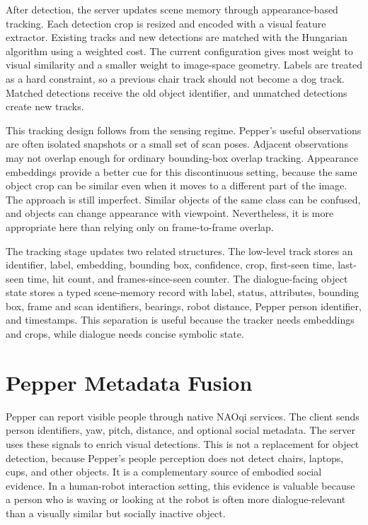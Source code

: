 After detection, the server updates scene memory through appearance-based tracking. Each detection crop is resized and encoded with a visual feature extractor. Existing tracks and new detections are matched with the Hungarian algorithm using a weighted cost. The current configuration gives most weight to visual similarity and a smaller weight to image-space geometry. Labels are treated as a hard constraint, so a previous chair track should not become a dog track. Matched detections receive the old object identifier, and unmatched detections create new tracks.

This tracking design follows from the sensing regime. Pepper's useful observations are often isolated snapshots or a small set of scan poses. Adjacent observations may not overlap enough for ordinary bounding-box overlap tracking. Appearance embeddings provide a better cue for this discontinuous setting, because the same object crop can be similar even when it moves to a different part of the image. The approach is still imperfect. Similar objects of the same class can be confused, and objects can change appearance with viewpoint. Nevertheless, it is more appropriate here than relying only on frame-to-frame overlap.

The tracking stage updates two related structures. The low-level track stores an identifier, label, embedding, bounding box, confidence, crop, first-seen time, last-seen time, hit count, and frames-since-seen counter. The dialogue-facing object state stores a typed scene-memory record with label, status, attributes, bounding box, frame and scan identifiers, bearings, robot distance, Pepper person identifier, and timestamps. This separation is useful because the tracker needs embeddings and crops, while dialogue needs concise symbolic state.

\section{Pepper Metadata Fusion}\label{sec:server-pepper-fusion}

Pepper can report visible people through native NAOqi services. The client sends person identifiers, yaw, pitch, distance, and optional social metadata. The server uses these signals to enrich visual detections. This is not a replacement for object detection, because Pepper's people perception does not detect chairs, laptops, cups, and other objects. It is a complementary source of embodied social evidence. In a human-robot interaction setting, this evidence is valuable because a person who is waving or looking at the robot is often more dialogue-relevant than a visually similar but socially inactive object.


